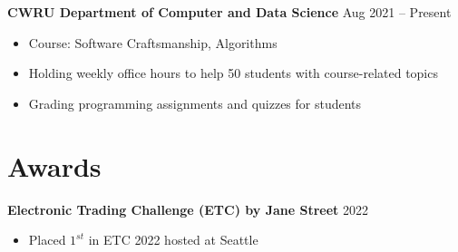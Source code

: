 \documentclass[11pt]{article}
\begin{document}
  
  \hspace{10pt}\textbf{CWRU Department of Computer and Data Science} \hfill {\small Aug 2021 -- Present} \\
  \vspace{-2pt}
  \begin{itemize}[leftmargin=31pt]
  \vspace{-10pt}
    \setlength\itemsep{-5pt}
      \item {\small Course: Software Craftsmanship, Algorithms}
      \item {\small Holding weekly office hours to help 50 students with course-related topics}
      \item {\small Grading programming assignments and quizzes for students}
      \vspace{-7pt}
  \end{itemize}

\section{Awards}

\hspace{10pt}\textbf{Electronic Trading Challenge (ETC) by Jane Street} \hfill {\small 2022}

\begin{itemize}[leftmargin=31pt]
\vspace{-10pt}
\setlength\itemsep{-5pt}
    \item {\small Placed $1^{st}$ in ETC 2022 hosted at Seattle}
    \vspace{-7pt}
\end{itemize}
\end{document}
